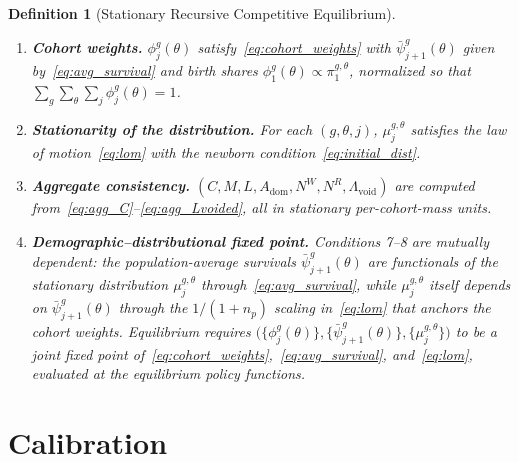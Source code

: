 \documentclass[12pt,a4paper]{article}
\newtheorem{definition}{Definition}
\begin{document}
\begin{definition}[Stationary Recursive Competitive Equilibrium]
\begin{enumerate}
\item \textbf{Cohort weights.} $\phi_{j}^{g}(\theta)$ satisfy~\eqref{eq:cohort_weights} with $\bar\psi_{j+1}^{g}(\theta)$ given by~\eqref{eq:avg_survival} and birth shares $\phi_1^{g}(\theta) \propto \pi^{g,\theta}_1$, normalized so that $\sum_g \sum_\theta \sum_j \phi_j^{g}(\theta) = 1$.
\item \textbf{Stationarity of the distribution.} For each $(g, \theta, j)$, $\mu_j^{g,\theta}$ satisfies the law of motion~\eqref{eq:lom} with the newborn condition~\eqref{eq:initial_dist}.
\item \textbf{Aggregate consistency.} $(C, M, L, A_{\mathrm{dom}}, N^W, N^R, \Lambda_{\mathrm{void}})$ are computed from~\eqref{eq:agg_C}--\eqref{eq:agg_Lvoided}, all in stationary per-cohort-mass units.
\item \textbf{Demographic--distributional fixed point.} Conditions 7--8 are mutually dependent: the population-average survivals $\bar\psi^{g}_{j+1}(\theta)$ are functionals of the stationary distribution $\mu^{g,\theta}_j$ through~\eqref{eq:avg_survival}, while $\mu^{g,\theta}_j$ itself depends on $\bar\psi^{g}_{j+1}(\theta)$ through the $1/(1+n_p)$ scaling in~\eqref{eq:lom} that anchors the cohort weights. Equilibrium requires $\bigl(\{\phi^{g}_j(\theta)\}, \{\bar\psi^{g}_{j+1}(\theta)\}, \{\mu^{g,\theta}_j\}\bigr)$ to be a joint fixed point of~\eqref{eq:cohort_weights},~\eqref{eq:avg_survival}, and~\eqref{eq:lom}, evaluated at the equilibrium policy functions.
\end{enumerate}
\end{definition}


\section{Calibration}
\label{sec:calibration}
\end{document}
